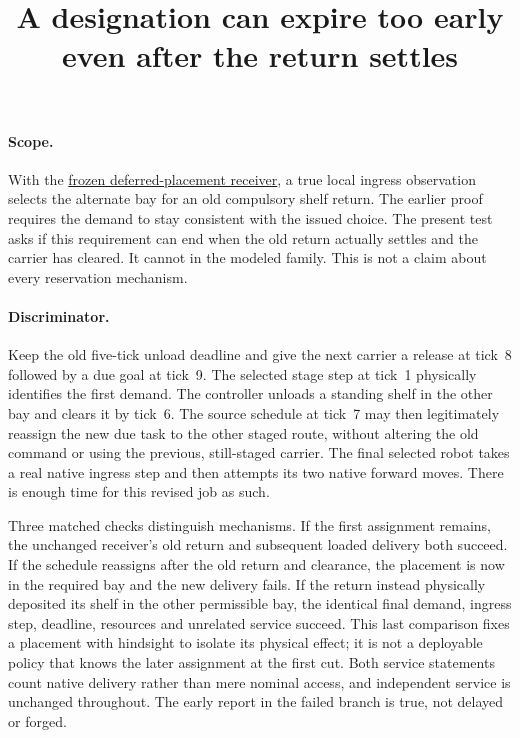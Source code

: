 \documentclass[11pt]{article}
\title{A designation can expire too early even after the return settles}
\date{}
\begin{document}
\maketitle

\paragraph{Scope.}
With the \href{https://github.com/eternal-november/eos-research-programmes/pull/582}
{frozen deferred-placement receiver}, a true local ingress observation
selects the alternate bay for an old compulsory shelf return. The earlier
proof requires the demand to stay consistent with the issued choice.
The present test asks if this requirement can end when the old return
actually settles and the carrier has cleared. It cannot in the modeled
family. This is not a claim about every reservation mechanism.

\paragraph{Discriminator.}
Keep the old five-tick unload deadline and give the next carrier a
release at tick~8 followed by a due goal at tick~9. The selected stage
step at tick~1 physically identifies the first demand. The controller
unloads a standing shelf in the other bay and clears it by tick~6.
The source schedule at tick~7 may then legitimately reassign the new due
task to the other staged route, without altering the old command or
using the previous, still-staged carrier. The final selected robot takes
a real native ingress step and then attempts its two native forward moves.
There is enough time for this revised job as such.

Three matched checks distinguish mechanisms. If the first assignment
remains, the unchanged receiver's old return and subsequent loaded
delivery both succeed. If the schedule reassigns after the old return
and clearance, the placement is now in the required bay and the new
delivery fails. If the return instead physically deposited its shelf
in the other permissible bay, the identical final demand, ingress step,
deadline, resources and unrelated service succeed. This last comparison
fixes a placement with hindsight to isolate its physical effect; it is
not a deployable policy that knows the later assignment at the first cut.
Both service statements count native delivery rather than mere
nominal access, and independent service is unchanged throughout.
The early report in the failed branch is true, not delayed or forged.
\end{document}
